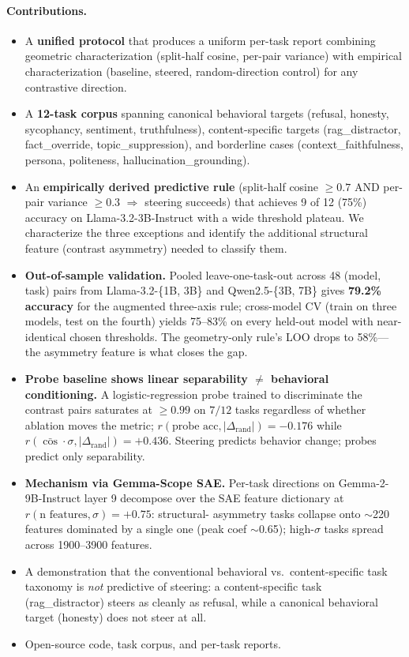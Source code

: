 \documentclass{article}
\begin{document}
\paragraph{Contributions.}
\begin{itemize}
\item A \textbf{unified protocol} that produces a uniform per-task
report combining geometric characterization (split-half cosine,
per-pair variance) with empirical characterization (baseline,
steered, random-direction control) for any contrastive
direction.
\item A \textbf{12-task corpus} spanning canonical behavioral targets
(refusal, honesty, sycophancy, sentiment, truthfulness),
content-specific targets (rag\_distractor, fact\_override,
topic\_suppression), and borderline cases (context\_faithfulness,
persona, politeness, hallucination\_grounding).
\item An \textbf{empirically derived predictive rule} (split-half
cosine $\geq 0.7$ AND per-pair variance $\geq 0.3$ $\Rightarrow$
steering succeeds) that achieves 9 of 12 (75\%) accuracy on
Llama-3.2-3B-Instruct with a wide threshold plateau. We characterize
the three exceptions and identify the additional structural feature
(contrast asymmetry) needed to classify them.
\item \textbf{Out-of-sample validation.} Pooled leave-one-task-out
across 48 (model, task) pairs from Llama-3.2-\{1B, 3B\} and
Qwen2.5-\{3B, 7B\} gives \textbf{79.2\% accuracy} for the augmented
three-axis rule; cross-model CV (train on three models, test on the
fourth) yields 75--83\% on every held-out model with near-identical
chosen thresholds. The geometry-only rule's LOO drops to 58\%---
the asymmetry feature is what closes the gap.
\item \textbf{Probe baseline shows linear separability $\neq$
behavioral conditioning.} A logistic-regression probe trained to
discriminate the contrast pairs saturates at $\geq 0.99$ on $7/12$
tasks regardless of whether ablation moves the metric;
$r(\text{probe acc}, |\Delta_{\text{rand}}|) = -0.176$ while
$r(\bar{\cos}\cdot\sigma, |\Delta_{\text{rand}}|) = +0.436$.
Steering predicts behavior change; probes predict only
separability.
\item \textbf{Mechanism via Gemma-Scope SAE.} Per-task directions
on Gemma-2-9B-Instruct layer 9 decompose over the SAE feature
dictionary at $r(\text{n features}, \sigma) = +0.75$: structural-
asymmetry tasks collapse onto $\sim$220 features dominated by a
single one (peak coef $\sim$0.65); high-$\sigma$ tasks spread
across 1900--3900 features.
\item A demonstration that the conventional behavioral
vs.~content-specific task taxonomy is \emph{not} predictive of
steering: a content-specific task (rag\_distractor) steers as
cleanly as refusal, while a canonical behavioral target (honesty)
does not steer at all.
\item Open-source code, task corpus, and per-task reports.
\end{itemize}
\end{document}
